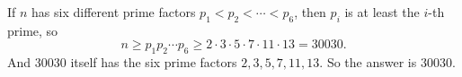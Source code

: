If $n$ has six different prime factors $p_1<p_2<\cdots<p_6$, then $p_i$ is at least the $i$-th prime, so
\[
n\ge p_1p_2\cdots p_6\ge2\cdot3\cdot5\cdot7\cdot11\cdot13=30030 .
\]
And $30030$ itself has the six prime factors $2,3,5,7,11,13$. So the answer is $\boxed{30030}$.

